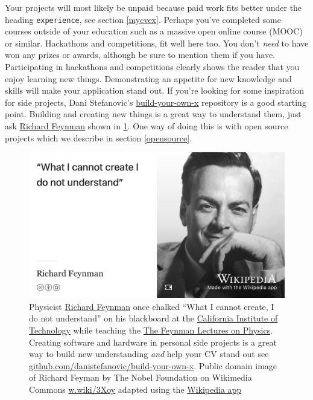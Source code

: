 \documentclass[
]{book}
\begin{document}
Your projects will most likely be unpaid because paid work fits better under the heading \texttt{experience}, see section \ref{mycvex}. Perhaps you've completed some courses outside of your education such as a massive open online course (MOOC) or similar. Hackathons and competitions, fit well here too. \citep{hafb} You don't \emph{need} to have won any prizes or awards, although be sure to mention them if you have. Participating in hackathons and competitions clearly shows the reader that you enjoy learning new things. Demonstrating an appetite for new knowledge and skills will make your application stand out. If you're looking for some inspiration for side projects, Dani Stefanovic's \href{https://github.com/danistefanovic/build-your-own-x}{build-your-own-x} repository is a good starting point. Building and creating new things is a great way to understand them, just ask \href{https://en.wikipedia.org/wiki/Richard_Feynman}{Richard Feynman} shown in \ref{fig:feynman-fig}. One way of doing this is with open source projects which we describe in section \ref{opensource}.

\begin{figure}

{\centering \includegraphics[width=1\linewidth]{images/what-I-cannot-create-I-do-not-understand} 

}

\caption{Physicist \href{https://en.wikipedia.org/wiki/Richard_Feynman}{Richard Feynman} once chalked ``What I cannot create, I do not understand'' on his blackboard at the \href{https://en.wikipedia.org/wiki/California_Institute_of_Technology}{California Institute of Technology} while teaching the \href{https://en.wikipedia.org/wiki/The_Feynman_Lectures_on_Physics}{The Feynman Lectures on Physics}. \citep{Way2017} Creating software and hardware in personal side projects is a great way to build new understanding \emph{and} help your CV stand out see \href{https://github.com/danistefanovic/build-your-own-x}{github.com/danistefanovic/build-your-own-x}. Public domain image of Richard Feyman by The Nobel Foundation on Wikimedia Commons \href{https://w.wiki/3Xoy}{w.wiki/3Xoy} adapted using the \href{https://apps.apple.com/us/app/wikipedia/id324715238}{Wikipedia app}}\label{fig:feynman-fig}
\end{figure}
\end{document}
